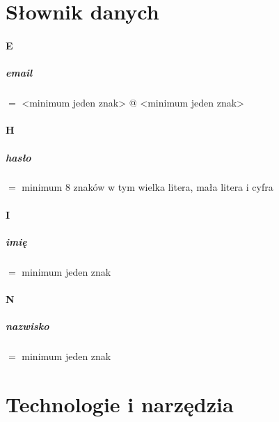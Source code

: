 \documentclass[12pt]{report}
\begin{document}

\chapter{Słownik danych}
	
	\subsubsection{E}
		\paragraph{email} $=$ <minimum jeden znak> @ <minimum jeden znak> 
		\subsubsection{H}
		\paragraph{hasło} $=$ minimum 8 znaków w tym wielka litera, mała litera i cyfra 
		\subsubsection{I}
		\paragraph{imię}  $=$ minimum jeden znak  
		\subsubsection{N}
		\paragraph{nazwisko} $=$ minimum jeden znak 


\chapter{Technologie i narzędzia}
\end{document}
